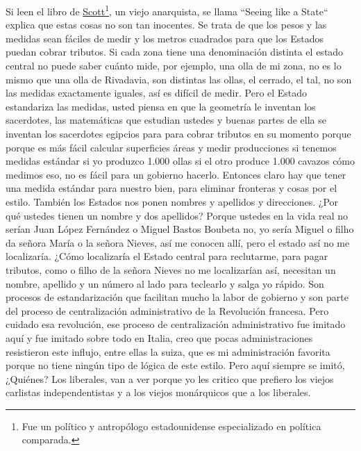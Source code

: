 Si leen el libro de \href{https://en.wikipedia.org/wiki/James_C._Scott}{Scott}\footnote{Fue un político y antropólogo estadounidense especializado en política comparada.}, un viejo anarquista, se llama ``Seeing like a State``\citep{scott1998seeing} explica que estas cosas no son tan inocentes. Se trata de que los pesos y las medidas sean fáciles de medir y los metros cuadrados para que los Estados puedan cobrar tributos. Si cada zona tiene una denominación distinta el estado central no puede saber cuánto mide, por ejemplo, una olla de mi zona, no es lo mismo que una olla de Rivadavia, son distintas las ollas, el cerrado, el tal, no son las medidas exactamente iguales, así es difícil de medir. Pero el Estado estandariza las medidas, usted piensa en que la geometría le inventan los sacerdotes, las matemáticas que estudian ustedes y buenas partes de ella se inventan los sacerdotes egipcios para para cobrar tributos en su momento porque porque es más fácil calcular superficies áreas y medir producciones si tenemos medidas estándar si yo produzco 1.000 ollas si el otro produce 1.000 cavazos cómo medimos eso, no es fácil para un gobierno hacerlo. Entonces claro hay que tener una medida estándar para nuestro bien, para eliminar fronteras y cosas por el estilo. También los Estados nos ponen nombres y apellidos y direcciones. ¿Por qué ustedes tienen un nombre y dos apellidos? Porque ustedes en la vida real no serían Juan López Fernández o Miguel Bastos Boubeta no, yo sería Miguel o filho da señora María o la señora Nieves, así me conocen allí, pero el estado así no me localizaría. ¿Cómo localizaría el Estado central para reclutarme, para pagar tributos, como o filho de la señora Nieves no me localizarían así, necesitan un nombre, apellido y un número al lado para teclearlo y salga yo rápido. Son procesos de estandarización que facilitan mucho la labor de gobierno y son parte del proceso de centralización administrativo de la Revolución francesa. Pero cuidado esa revolución, ese proceso de centralización administrativo fue imitado aquí y fue imitado sobre todo en Italia, creo que pocas administraciones resistieron este influjo, entre ellas la suiza, que es mi administración favorita porque no tiene ningún tipo de lógica de este estilo. Pero aquí siempre se imitó, ¿Quiénes? Los liberales, van a ver porque yo les critico que prefiero los viejos carlistas independentistas y a los viejos monárquicos que a los liberales.

